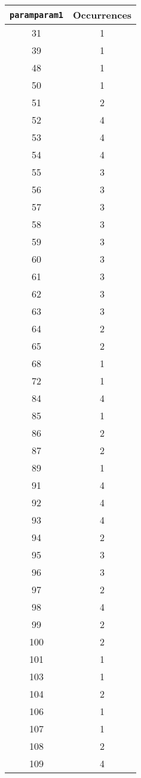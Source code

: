 \documentclass[letterpaper, 12pt]{article}
\begin{document}
\begin{longtable}{|c|c|}
\hline
\textbf{\texttt{paramparam1}} & \textbf{Occurrences} \\
\hline
31 & 1 \\
\hline
39 & 1 \\
\hline
48 & 1 \\
\hline
50 & 1 \\
\hline
51 & 2 \\
\hline
52 & 4 \\
\hline
53 & 4 \\
\hline
54 & 4 \\
\hline
55 & 3 \\
\hline
56 & 3 \\
\hline
57 & 3 \\
\hline
58 & 3 \\
\hline
59 & 3 \\
\hline
60 & 3 \\
\hline
61 & 3 \\
\hline
62 & 3 \\
\hline
63 & 3 \\
\hline
64 & 2 \\
\hline
65 & 2 \\
\hline
68 & 1 \\
\hline
72 & 1 \\
\hline
84 & 4 \\
\hline
85 & 1 \\
\hline
86 & 2 \\
\hline
87 & 2 \\
\hline
89 & 1 \\
\hline
91 & 4 \\
\hline
92 & 4 \\
\hline
93 & 4 \\
\hline
94 & 2 \\
\hline
95 & 3 \\
\hline
96 & 3 \\
\hline
97 & 2 \\
\hline
98 & 4 \\
\hline
99 & 2 \\
\hline
100 & 2 \\
\hline
101 & 1 \\
\hline
103 & 1 \\
\hline
104 & 2 \\
\hline
106 & 1 \\
\hline
107 & 1 \\
\hline
108 & 2 \\
\hline
109 & 4 \\

\end{longtable}
\end{document}
